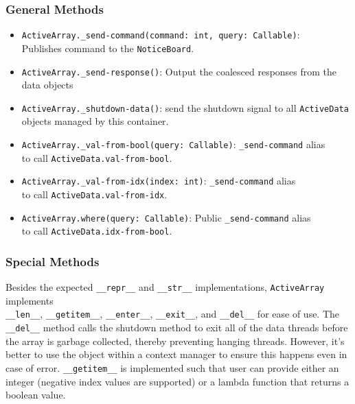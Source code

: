 \documentclass[10pt]{article}
\begin{document}
	\subsubsection{General Methods}
		\begin{itemize}
			\item \lstinline|ActiveArray._send-command(command: int, query: Callable)|:\\ Publishes command to the \lstinline|NoticeBoard|.
			
			\item \lstinline|ActiveArray._send-response()|: Output the coalesced responses from the data objects
			
			\item \lstinline|ActiveArray._shutdown-data()|: send the shutdown signal to all \lstinline|ActiveData| objects managed by this container.
			
			\item \lstinline|ActiveArray._val-from-bool(query: Callable)|: \lstinline|_send-command| alias\\to call \lstinline|ActiveData.val-from-bool|.
			
			\item \lstinline|ActiveArray._val-from-idx(index: int)|: \lstinline|_send-command| alias\\to call \lstinline|ActiveData.val-from-idx|.
			
			\item \lstinline|ActiveArray.where(query: Callable)|: Public \lstinline|_send-command| alias\\to call \lstinline|ActiveData.idx-from-bool|.
		\end{itemize}
	\subsubsection{Special Methods}
		Besides the expected \lstinline|__repr__| and \lstinline|__str__| implementations, \lstinline|ActiveArray| implements\\
		\lstinline|__len__|, \lstinline|__getitem__|, \lstinline|__enter__|, \lstinline|__exit__|, and \lstinline|__del__| for ease of use. The \lstinline|__del__| method calls the shutdown method to exit all of the data threads before the array is garbage collected, thereby preventing hanging threads. However, it's better to use the object within a context manager to ensure this happens even in case of error.
		\lstinline|__getitem__| is implemented such that user can provide either an integer (negative index values are supported) or a lambda function that returns a boolean value.
\end{document}
